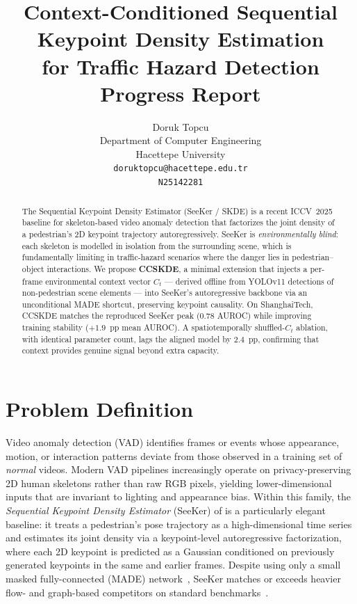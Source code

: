 \documentclass{article}
\title{Context-Conditioned Sequential Keypoint Density Estimation\\
       for Traffic Hazard Detection \\ \vspace{0.4em}
       {\large Progress Report}}
\author{Doruk Topcu \\
        Department of Computer Engineering \\
        Hacettepe University \\
        \texttt{doruktopcu@hacettepe.edu.tr} \\
        \texttt{N25142281}}
\begin{document}
\maketitle

\begin{abstract}
The Sequential Keypoint Density Estimator (SeeKer / SKDE) is a recent
ICCV~2025 baseline for skeleton-based video anomaly detection that factorizes
the joint density of a pedestrian's 2D keypoint trajectory autoregressively.
SeeKer is \emph{environmentally blind}: each skeleton is modelled in
isolation from the surrounding scene, which is fundamentally limiting in
traffic-hazard scenarios where the danger lies in pedestrian--object
interactions. We propose \textbf{CCSKDE}, a minimal extension that injects a
per-frame environmental context vector $C_t$ --- derived offline from
YOLOv11 detections of non-pedestrian scene elements --- into SeeKer's
autoregressive backbone via an unconditional MADE shortcut, preserving
keypoint causality. On ShanghaiTech, CCSKDE matches the reproduced SeeKer
peak ($0.78$ AUROC) while improving training stability ($+1.9$~pp mean
AUROC). A spatiotemporally shuffled-$C_t$ ablation, with identical parameter
count, lags the aligned model by $2.4$~pp, confirming that context
provides genuine signal beyond extra capacity.
\end{abstract}

\section{Problem Definition}
\label{sec:problem}

Video anomaly detection (VAD) identifies frames or events whose appearance,
motion, or interaction patterns deviate from those observed in a training
set of \emph{normal} videos. Modern VAD pipelines increasingly operate on
privacy-preserving 2D human skeletons rather than raw RGB pixels, yielding
lower-dimensional inputs that are invariant to lighting and appearance bias.
Within this family, the \emph{Sequential Keypoint Density Estimator}
(SeeKer) of \citet{delic2025seeker} is a particularly elegant baseline: it
treats a pedestrian's pose trajectory as a high-dimensional time series and
estimates its joint density via a keypoint-level autoregressive
factorization, where each 2D keypoint is predicted as a Gaussian conditioned
on previously generated keypoints in the same and earlier frames. Despite
using only a small masked fully-connected (MADE)
network~\citep{germain2015made}, SeeKer matches or exceeds heavier flow- and
graph-based competitors on standard
benchmarks~\citep{hirschorn2023normalizing,liu2018future}.
\end{document}
